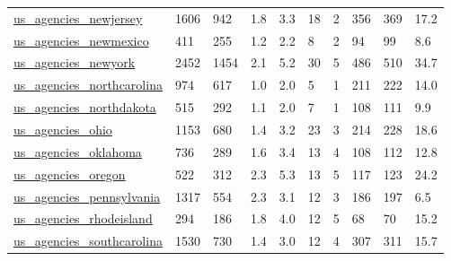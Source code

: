 \begin{longtable}{llllllllll}
 \href{http://govmaps.cid.hks.harvard.edu}{us\_agencies\_newjersey}                                                           & 1606       & 942   & 1.8    & 3.3    & 18    & 2      & 356    & 369    & 17.2    \\
 \href{http://govmaps.cid.hks.harvard.edu}{us\_agencies\_newmexico}                                                           & 411        & 255   & 1.2    & 2.2    & 8     & 2      & 94     & 99     & 8.6     \\
 \href{http://govmaps.cid.hks.harvard.edu}{us\_agencies\_newyork}                                                             & 2452       & 1454  & 2.1    & 5.2    & 30    & 5      & 486    & 510    & 34.7    \\
 \href{http://govmaps.cid.hks.harvard.edu}{us\_agencies\_northcarolina}                                                       & 974        & 617   & 1.0    & 2.0    & 5     & 1      & 211    & 222    & 14.0    \\
 \href{http://govmaps.cid.hks.harvard.edu}{us\_agencies\_northdakota}                                                         & 515        & 292   & 1.1    & 2.0    & 7     & 1      & 108    & 111    & 9.9     \\
 \href{http://govmaps.cid.hks.harvard.edu}{us\_agencies\_ohio}                                                                & 1153       & 680   & 1.4    & 3.2    & 23    & 3      & 214    & 228    & 18.6    \\
 \href{http://govmaps.cid.hks.harvard.edu}{us\_agencies\_oklahoma}                                                            & 736        & 289   & 1.6    & 3.4    & 13    & 4      & 108    & 112    & 12.8    \\
 \href{http://govmaps.cid.hks.harvard.edu}{us\_agencies\_oregon}                                                              & 522        & 312   & 2.3    & 5.3    & 13    & 5      & 117    & 123    & 24.2    \\
 \href{http://govmaps.cid.hks.harvard.edu}{us\_agencies\_pennsylvania}                                                        & 1317       & 554   & 2.3    & 3.1    & 12    & 3      & 186    & 197    & 6.5     \\
 \href{http://govmaps.cid.hks.harvard.edu}{us\_agencies\_rhodeisland}                                                         & 294        & 186   & 1.8    & 4.0    & 12    & 5      & 68     & 70     & 15.2    \\
 \href{http://govmaps.cid.hks.harvard.edu}{us\_agencies\_southcarolina}                                                       & 1530       & 730   & 1.4    & 3.0    & 12    & 4      & 307    & 311    & 15.7    \\

\end{longtable}
